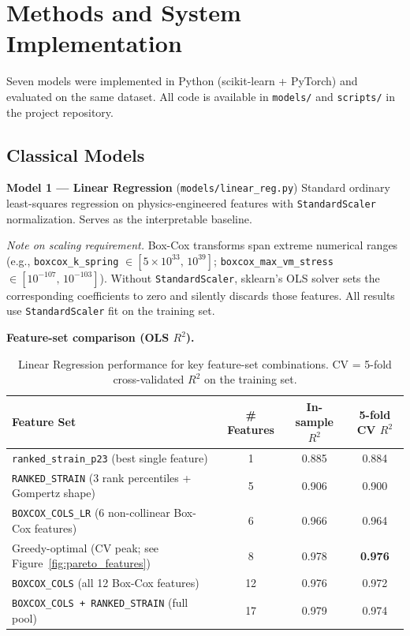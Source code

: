 \documentclass[10pt,letterpaper]{article}
\newcommand{\Rsq}{R^2}
\begin{document}
\section{Methods and System Implementation}

Seven models were implemented in Python (scikit-learn + PyTorch) and evaluated on the same
dataset. All code is available in \texttt{models/} and \texttt{scripts/} in the project
repository.

\subsection{Classical Models}

\textbf{Model 1 --- Linear Regression} (\texttt{models/linear\_reg.py})
Standard ordinary least-squares regression on physics-engineered features with
\texttt{StandardScaler} normalization. Serves as the interpretable baseline.

\textit{Note on scaling requirement.} Box-Cox transforms span extreme numerical ranges
(e.g., \texttt{boxcox\_k\_spring} $\in [5\times10^{33},\, 10^{39}]$;
\texttt{boxcox\_max\_vm\_stress} $\in [10^{-107},\, 10^{-103}]$). Without
\texttt{StandardScaler}, sklearn's OLS solver sets the corresponding coefficients to zero and
silently discards those features. All results use \texttt{StandardScaler} fit on the training
set.

\textbf{Feature-set comparison (OLS $\Rsq$).}

\begin{table}[H]
  \caption{Linear Regression performance for key feature-set combinations. CV = 5-fold
    cross-validated $\Rsq$ on the training set.}
  \label{tab:lr_feats}
  \centering\small
  \begin{tabular}{@{}lccc@{}}
    \toprule
    \textbf{Feature Set} & \textbf{\# Features}
      & \textbf{In-sample $\Rsq$} & \textbf{5-fold CV $\Rsq$} \\
    \midrule
    \texttt{ranked\_strain\_p23} (best single feature) & 1  & 0.885 & 0.884 \\
    \texttt{RANKED\_STRAIN} (3 rank percentiles + Gompertz shape) & 5  & 0.906 & 0.900 \\
    \texttt{BOXCOX\_COLS\_LR} (6 non-collinear Box-Cox features)  & 6  & 0.966 & 0.964 \\
    Greedy-optimal (CV peak; see Figure~\ref{fig:pareto_features}) & 8  & 0.978 & \textbf{0.976} \\
    \texttt{BOXCOX\_COLS} (all 12 Box-Cox features)               & 12 & 0.976 & 0.972 \\
    \texttt{BOXCOX\_COLS + RANKED\_STRAIN} (full pool)            & 17 & 0.979 & 0.974 \\
    \bottomrule
  \end{tabular}
\end{table}
\end{document}
